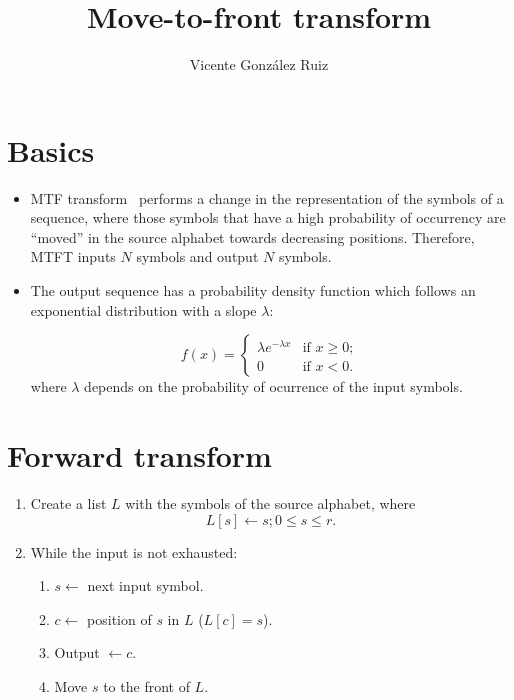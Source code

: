 
\title{Move-to-front transform}

\author{Vicente González Ruiz}

\maketitle

\section{Basics}
\begin{itemize}
\item
  MTF transform~\cite{manzini2001analysis} performs a change in the
  representation of the symbols of a sequence, where those symbols
  that have a high probability of occurrency are ``moved'' in the
  source alphabet towards decreasing positions.  Therefore, MTFT
  inputs \(N\) symbols and output \(N\) symbols.
\item
  The output sequence has a probability density function which follows
  an exponential distribution with a slope \(\lambda\):

  \begin{equation}
    f(x) = \left\{
      \begin{array}{ll}
        \lambda e^{-\lambda x} & \mbox{if $x \geq 0$};\\
        0 & \mbox{if $x < 0$}.
      \end{array} \right.
  \end{equation}
  where \(\lambda\) depends on the probability of ocurrence of the input
  symbols.
\end{itemize}

\section{Forward transform}
\begin{enumerate}
\def\labelenumi{\arabic{enumi}.}
\tightlist
\item
  Create a list \(L\) with the symbols of the source alphabet, where
  \[L[s]\leftarrow s; 0\le s\le r.\]
\item
  While the input is not exhausted:
  \begin{enumerate}
  \def\labelenumii{\arabic{enumii}.}
  \tightlist
  \item
    \(s\leftarrow\) next input symbol.
  \item
    \(c\leftarrow\) position of \(s\) in \(L\) (\(L[c]=s\)).
  \item
    Output \(\leftarrow c\).
  \item
    Move \(s\) to the front of \(L\).
  \end{enumerate}
\end{enumerate}

